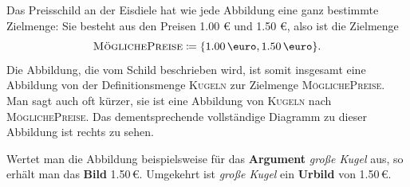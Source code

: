 \documentclass[../../main.tex]{subfiles}
\begin{document}
\pagebreak
\begin{example}
    Das Preisschild an der Eisdiele hat wie jede Abbildung eine ganz bestimmte Zielmenge: Sie besteht aus den Preisen 1.00 \euro{} und 1.50 \euro, also ist die Zielmenge \[\textsc{MöglichePreise}\coloneqq\{\text{1.00\,\euro},\text{1.50\,\euro}\}.\]
    Die Abbildung, die vom Schild beschrieben wird, ist somit insgesamt eine Abbildung von der Definitionsmenge \textsc{Kugeln} zur Zielmenge \textsc{MöglichePreise}. Man sagt auch oft kürzer, sie ist eine Abbildung von \textsc{Kugeln} nach \textsc{MöglichePreise}. Das dementsprechende vollständige Diagramm zu dieser Abbildung ist rechts zu sehen.
    
    Wertet man die Abbildung beispielsweise für das \textbf{Argument} \emph{große Kugel} aus, so erhält man das \textbf{Bild} 1.50\,\euro. Umgekehrt ist \emph{große Kugel} ein \textbf{Urbild} von 1.50\,\euro.
\end{example}
\end{document}
